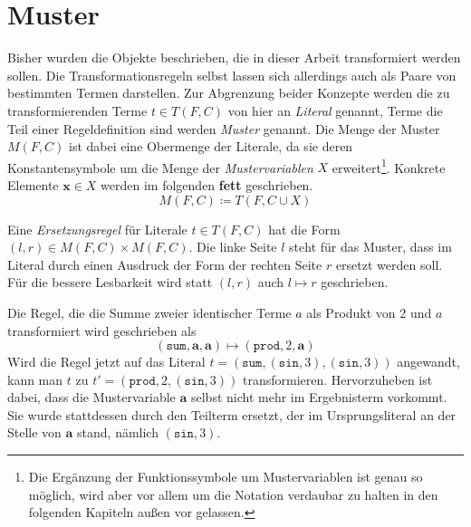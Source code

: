 \section{Muster} \label{subsecMuster}

Bisher wurden die Objekte beschrieben, die in dieser Arbeit transformiert werden sollen. Die Transformationsregeln selbst lassen sich allerdings auch als Paare von bestimmten Termen darstellen. Zur Abgrenzung beider Konzepte werden die zu transformierenden Terme $t\in T(F, C)$ von hier an \emph{Literal} genannt, Terme die  Teil einer Regeldefinition sind werden \emph{Muster} genannt. Die Menge der Muster $M(F, C)$ ist dabei eine Obermenge der Literale, da sie deren Konstantensymbole um die Menge der \emph{Mustervariablen} $X$ erweitert\footnote{Die Ergänzung der Funktionssymbole um Mustervariablen ist genau so möglich, wird aber vor allem um die Notation verdaubar zu halten in den folgenden Kapiteln außen vor gelassen.}. Konkrete Elemente $\mathbf x \in X$ werden im folgenden \textbf{fett} geschrieben.
$$M(F, C) \coloneqq T(F, C \cup X)$$

Eine \emph{Ersetzungsregel} für Literale $t \in T(F, C)$ hat die Form $(l, r) \in M(F, C) \times M(F, C)$. Die linke Seite $l$ steht für das Muster, dass im Literal durch einen Ausdruck der Form der rechten Seite $r$ ersetzt werden soll. Für die bessere Lesbarkeit wird statt $(l, r)$ auch $l \mapsto r$ geschrieben.

\begin{beispiel} \label{bMuster}
Die Regel, die die Summe zweier identischer Terme $a$ als Produkt von $2$ und $a$ transformiert wird geschrieben als
$$(\texttt{sum}, \mathbf a, \mathbf a) \mapsto (\texttt{prod}, 2, \mathbf a)$$
Wird die Regel jetzt auf das Literal 
$t = (\texttt{sum}, (\texttt{sin}, 3), (\texttt{sin}, 3))$ angewandt, kann man $t$ zu $t' = (\texttt{prod}, 2, (\texttt{sin}, 3))$ transformieren. 
Hervorzuheben ist dabei, dass die Mustervariable $\mathbf a$ selbst nicht mehr im Ergebnisterm vorkommt. Sie wurde stattdessen durch den Teilterm ersetzt, der im Ursprungsliteral an der Stelle von $\mathbf a$ stand, nämlich $(\texttt{sin}, 3)$.
\end{beispiel}

